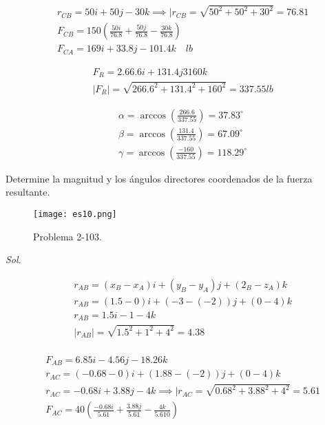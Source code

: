 \begin{align*}
	 & r_{CB}=50i+50j-30k\implies \mid r_{CB}=\sqrt{50^2+50^2+30^2}=76.81        \\
	 & F_{CB}=150\left(\frac{50i}{76.8}+\frac{50j}{76.8}-\frac{30k}{76.8}\right) \\
	 & F_{CA}=169i+33.8j-101.4k\quad lb
\end{align*}

\begin{align*}
	 & F_R=2.66.6i+131.4j3160k                             \\
	 & \mid F_R\mid =\sqrt{266.6^2+131.4^2+160^2}=337.55lb
\end{align*}

\begin{align*}
	 & \alpha=\arccos \left(\frac{266.6}{337.55}\right)=37.83^{\circ}  \\
	 & \beta=\arccos \left(\frac{131.4}{337.55} \right)=67.09^{\circ}  \\
	 & \gamma=\arccos \left(\frac{-160}{337.55} \right)=118.29^{\circ}
\end{align*}


\begin{problem}
Determine la magnitud y los ángulos directores coordenados de la fuerza resultante.
\end{problem}

\begin{figure}[h!]
	\centering
	\texttt{[image: es10.png]}
	\caption{Problema 2-103.}
	\label{es10}
\end{figure}

\textit{ Sol.}

\begin{align*}
	 & r_{AB}=(x_B-x_A)i+(y_B-y_A)j+(2_B-z_A)k    \\
	 & r_{AB}=(1.5-0)i+(-3-(-2))j+(0-4)k          \\
	 & r_{AB}=1.5i-1-4k                           \\
	 & \mid r_{AB}\mid =\sqrt{1.5^2+1^2+4^2}=4.38 \\
\end{align*}

\begin{align*}
	 & F_{AB}=6.85i-4.56j-18.26k                                                       \\
	 & r_{AC}=(-0.68-0)i+(1.88-(-2))j+(0-4)k                                           \\
	 & r_{AC}=-0.68i+3.88j-4k\implies \mid r_{AC}=\sqrt{0.68^2+3.88^2+4^2}=5.61        \\
	 & F_{AC}=40\left( \frac{-0.68i}{5.61}+\frac{3.88j}{5.61}-\frac{4k}{5.610} \right)
\end{align*}

